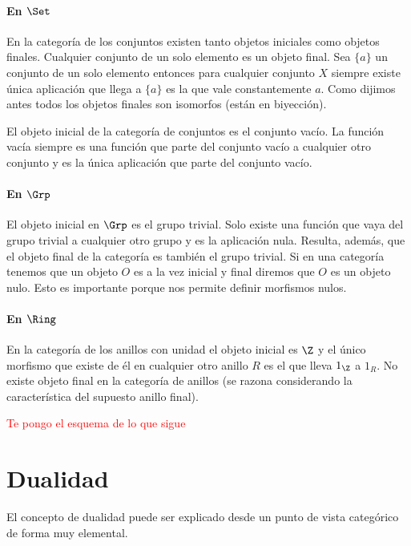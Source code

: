 \paragraph{En $\Set$}
En la categoría de los conjuntos existen tanto objetos iniciales
como objetos finales. Cualquier conjunto de un solo elemento es
un objeto final. Sea $\{a\}$ un conjunto de un solo elemento
entonces para cualquier conjunto $X$ siempre existe
única aplicación que llega a $\{a\}$ es la que vale
constantemente $a$. Como dijimos antes todos los objetos finales
son isomorfos (están en biyección).

El objeto inicial de la categoría de conjuntos es el conjunto vacío.
La función vacía siempre es una función que parte del conjunto
vacío a cualquier otro conjunto y es la única aplicación que parte del
conjunto vacío.

\paragraph{En $\Grp$}
El objeto inicial en $\Grp$ es el grupo trivial. Solo existe una función
que vaya del grupo trivial a cualquier otro grupo y es la aplicación
nula. Resulta, además, que el objeto final de la categoría es también
el grupo trivial. Si en una categoría tenemos que un objeto
$O$ es a la vez inicial y final diremos que $O$ es un objeto nulo. Esto
es importante porque nos permite definir morfismos nulos.

\paragraph{En $\Ring$}
En la categoría de los anillos con unidad el objeto inicial es
$\Z$ y el único morfismo que existe de él en cualquier otro anillo
$R$ es el que lleva $1_\Z$ a $1_R$. No existe objeto final en la
categoría de anillos (se razona considerando la característica
del supuesto anillo final).







\textcolor{red}{Te pongo el esquema de lo que sigue}

\section{Dualidad}

El concepto de dualidad puede ser explicado desde un punto de vista categórico de forma muy elemental.

